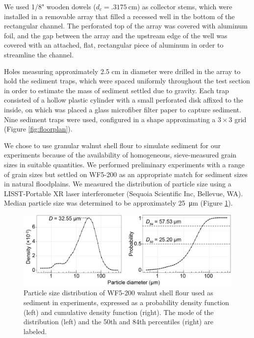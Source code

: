 \documentclass{scrreprt}
\begin{document}
We used 1/8" wooden dowels ($d_c = \SI{.3175}{\centi\metre}$) as collector stems, which were installed in a removable array that filled a recessed well in the bottom of the rectangular channel. The perforated top of the array was covered with aluminum foil, and the gap between the array and the upstream edge of the well was covered with an attached, flat, rectangular piece of aluminum in order to streamline the channel. 

Holes measuring approximately 2.5 cm in diameter were drilled in the array to hold the sediment traps, which were spaced uniformly throughout the test section in order to estimate the mass of sediment settled due to gravity. Each trap consisted of a hollow plastic cylinder with a small perforated disk affixed to the inside, on which was placed a glass microfiber filter paper to capture sediment. Nine sediment traps were used, configured in a shape approximating a $3 \times 3$ grid (Figure \ref{fig:floorplan}).

We chose to use granular walnut shell flour to simulate sediment for our experiments because of the availability of homogeneous, sieve-measured grain sizes in suitable quantities. We performed preliminary experiments with a range of grain sizes but settled on WF5-200 as an appropriate match for sediment sizes in natural floodplains. We measured the distribution of particle size using a LISST-Portable XR laser interferometer (Sequoia Scientific Inc, Bellevue, WA). Median particle size was determined to be approximately \SI{25}{\micro\metre} (Figure \ref{fig:sedsize}).

\begin{figure}[htbp]
\includegraphics[width=15cm] {wf5-200sizedist.png}
\centering
\caption{Particle size distribution of WF5-200 walnut shell flour used as sediment in experiments, expressed as a probability density function (left) and cumulative density function (right). The mode of the distribution (left) and the 50th and 84th percentiles (right) are labeled.} 
\label{fig:sedsize}
\end{figure}
\end{document}
